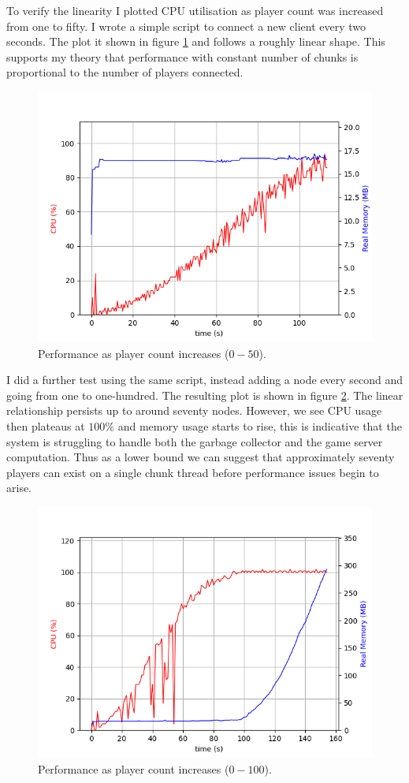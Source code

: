 \documentclass[10pt,twoside,notitlepage,a4paper]{report}
\begin{document}
	To verify the linearity I plotted CPU utilisation as player count was increased from one to fifty. I wrote a simple script to connect a new client every two seconds. The plot it shown in figure \ref{fig:linear50} and follows a roughly linear shape. This supports my theory that performance with constant number of chunks is proportional to the number of players connected.
	\begin{figure}
		\includegraphics[width=\textwidth]{linear.png}
		\caption{Performance as player count increases ($0-50$).}
		\label{fig:linear50}
	\end{figure}

	I did a further test using the same script, instead adding a node every second and going from one to one-hundred. The resulting plot is shown in figure \ref{fig:linear100}. The linear relationship persists up to around seventy nodes. However, we see CPU usage then plateaus at $100\%$ and memory usage starts to rise, this is indicative that the system is struggling to handle both the garbage collector and the game server computation. Thus as a lower bound we can suggest that approximately seventy players can exist on a single chunk thread before performance issues begin to arise.
	\begin{figure}
		\includegraphics[width=\textwidth]{linear100.png}
		\caption{Performance as player count increases ($0-100$).}
		\label{fig:linear100}
	\end{figure}
\end{document}
